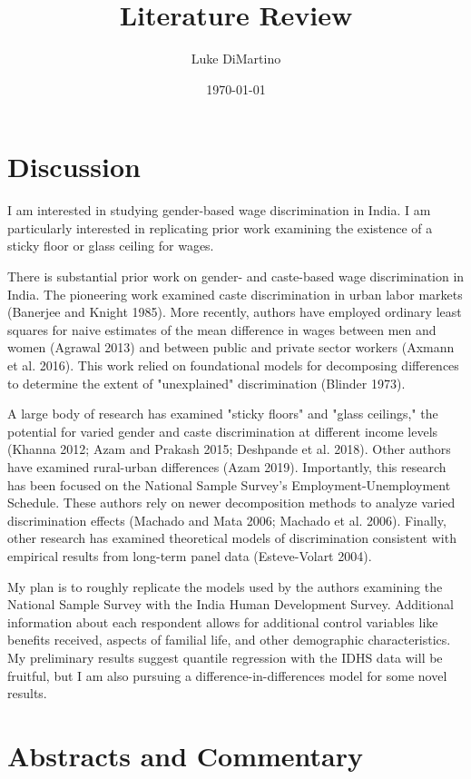 \documentclass[a4paper]{article}
\title{Literature Review}
\author{Luke DiMartino}
\date{\today}
\begin{document}
\maketitle

\section{Discussion}
I am interested in studying gender-based wage discrimination in India. I am particularly interested in replicating prior work examining the existence of a sticky floor or glass ceiling for wages.

There is substantial prior work on gender- and caste-based wage discrimination in India. The pioneering work examined caste discrimination in urban labor markets (Banerjee and Knight 1985). More recently, authors have employed ordinary least squares for naive estimates of the mean difference in wages between men and women (Agrawal 2013) and between public and private sector workers (Axmann et al. 2016). This work relied on foundational models for decomposing differences to determine the extent of "unexplained" discrimination (Blinder 1973).


A large body of research has examined "sticky floors" and "glass ceilings," the potential for varied gender and caste discrimination at different income levels (Khanna 2012; Azam and Prakash 2015; Deshpande et al. 2018). Other authors have examined rural-urban differences (Azam 2019). Importantly, this research has been focused on the National Sample Survey's Employment-Unemployment Schedule. These authors rely on newer decomposition methods to analyze varied discrimination effects (Machado and Mata 2006; Machado et al. 2006). Finally, other research has examined theoretical models of discrimination consistent with empirical results from long-term panel data (Esteve-Volart 2004).

My plan is to roughly replicate the models used by the authors examining the National Sample Survey with the India Human Development Survey. Additional information about each respondent allows for additional control variables like benefits received, aspects of familial life, and other demographic characteristics. My preliminary results suggest quantile regression with the IDHS data will be fruitful, but I am also pursuing a difference-in-differences model for some novel results.

\section{Abstracts and Commentary}
\end{document}
